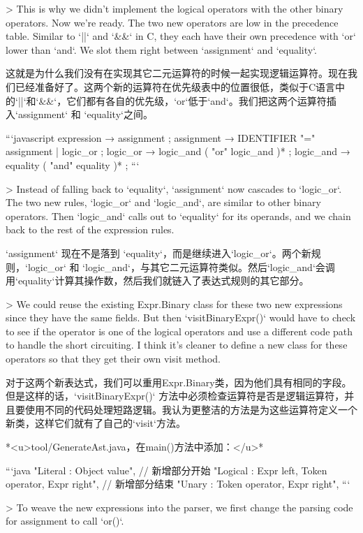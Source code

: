 \documentclass[cn,11pt,chinese]{elegantbook}
\begin{document}
{{> This is why we didn’t implement the logical operators with the other binary operators. Now we’re ready. The two new operators are low in the precedence table. Similar to `||` and `&&` in C, they each have their own precedence with `or` lower than `and`. We slot them right between `assignment` and `equality`.

这就是为什么我们没有在实现其它二元运算符的时候一起实现逻辑运算符。现在我们已经准备好了。这两个新的运算符在优先级表中的位置很低，类似于C语言中的`||`和`&&`，它们都有各自的优先级，`or`低于`and`。我们把这两个运算符插入`assignment` 和 `equality`之间。

```javascript
expression     → assignment ;
assignment     → IDENTIFIER "=" assignment
               | logic_or ;
logic_or       → logic_and ( "or" logic_and )* ;
logic_and      → equality ( "and" equality )* ;
```

> Instead of falling back to `equality`, `assignment` now cascades to `logic_or`. The two new rules, `logic_or` and `logic_and`, are similar to other binary operators. Then `logic_and` calls out to `equality` for its operands, and we chain back to the rest of the expression rules.

`assignment` 现在不是落到 `equality`，而是继续进入`logic_or`。两个新规则，`logic_or` 和 `logic_and`，与其它二元运算符类似。然后`logic_and`会调用`equality`计算其操作数，然后我们就链入了表达式规则的其它部分。

> We could reuse the existing Expr.Binary class for these two new expressions since they have the same fields. But then `visitBinaryExpr()` would have to check to see if the operator is one of the logical operators and use a different code path to handle the short circuiting. I think it’s cleaner to define a new class for these operators so that they get their own visit method.

对于这两个新表达式，我们可以重用Expr.Binary类，因为他们具有相同的字段。但是这样的话，`visitBinaryExpr()` 方法中必须检查运算符是否是逻辑运算符，并且要使用不同的代码处理短路逻辑。我认为更整洁的方法是为这些运算符定义一个新类，这样它们就有了自己的`visit`方法。

*<u>tool/GenerateAst.java，在main()方法中添加：</u>*

```java
      "Literal  : Object value",
      // 新增部分开始
      "Logical  : Expr left, Token operator, Expr right",
      // 新增部分结束
      "Unary    : Token operator, Expr right",
```

> To weave the new expressions into the parser, we first change the parsing code for assignment to call `or()`.

}}
\end{document}
